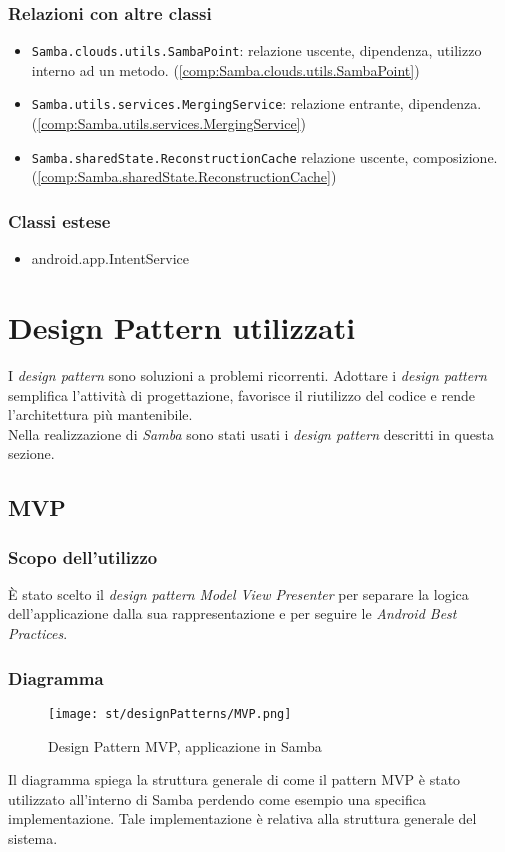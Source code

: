 \subsubsection{Relazioni con altre classi}
\begin{itemize}
	\item \texttt{Samba.clouds.utils.SambaPoint}: relazione uscente, dipendenza, utilizzo interno ad un metodo. (\ref{comp:Samba.clouds.utils.SambaPoint})
	\item \texttt{Samba.utils.services.MergingService}: relazione entrante, dipendenza. (\ref{comp:Samba.utils.services.MergingService})
	\item \texttt{Samba.sharedState.ReconstructionCache} relazione uscente, composizione. (\ref{comp:Samba.sharedState.ReconstructionCache})
\end{itemize}
\subsubsection{Classi estese}
\begin{itemize}
	\item android.app.IntentService
\end{itemize}


\section{Design Pattern utilizzati}
I \emph{design pattern} sono soluzioni a problemi ricorrenti. Adottare i \emph{design pattern} semplifica
l'attività di progettazione, favorisce il riutilizzo del codice e rende l'architettura
più mantenibile.\\
Nella realizzazione di \emph{Samba} sono stati usati i \emph{design pattern} descritti in questa sezione.

\subsection{MVP}
\subsubsection{Scopo dell'utilizzo}
È stato scelto il \emph{design pattern} \emph{Model View Presenter} per separare la logica dell'applicazione dalla sua rappresentazione e per seguire le \emph{Android Best Practices}.
\subsubsection{Diagramma}
\begin{figure}[H] 
    \centering 
    \texttt{[image: st/designPatterns/MVP.png]} 
    \caption{Design Pattern MVP, applicazione in Samba}
\end{figure}
Il diagramma spiega la struttura generale di come il pattern MVP è stato utilizzato all'interno di Samba perdendo come esempio una specifica implementazione. Tale implementazione è relativa alla struttura generale del sistema.
